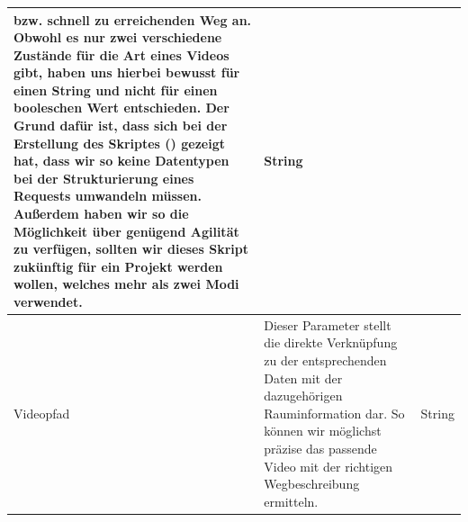 \begin{tabular}{| l | p{9.45cm} | c| }
    bzw. schnell zu erreichenden Weg an. Obwohl es nur zwei verschiedene Zustände für die Art eines Videos gibt, haben uns hierbei bewusst für einen String und nicht für einen booleschen Wert entschieden. Der Grund dafür ist, dass sich bei der Erstellung des Skriptes () gezeigt hat, dass wir so keine Datentypen bei der Strukturierung eines Requests umwandeln müssen. Außerdem haben wir so die Möglichkeit über genügend Agilität zu verfügen, sollten wir dieses Skript zukünftig für ein Projekt werden wollen, welches mehr als zwei Modi verwendet. & String                                                                                                                                                                                                                                                                                                        \\[0.5ex]
    \hline
    Videopfad                                                                                                                                                                                                                                                                                                                                                                                                                                                                                                                                                       & \small Dieser Parameter stellt die direkte Verknüpfung zu der entsprechenden Daten mit der dazugehörigen Rauminformation dar. So können wir möglichst präzise das passende Video mit der richtigen Wegbeschreibung ermitteln.
                                                                                                                                                                                                                                                                                                                                                                                                                                                                                                                                                                    & String                                                                                                                                                                                                                                                                                                        \\
    \hline

\end{tabular}
